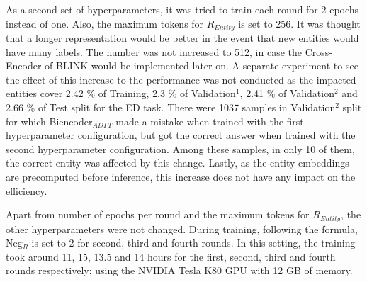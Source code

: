 \documentclass{report}
\theoremstyle{definition}
\theoremstyle{remark}
\begin{document}
As a second set of hyperparameters, it was tried to train each round for 2 epochs instead of one. Also, the maximum tokens for $R_{Entity}$ is set to 256. It was thought that a longer representation would be better in the event that new entities would have many labels. The number was not increased to 512, in case the Cross-Encoder of BLINK \cite{scalablezeroshot} would be implemented later on. A separate experiment to see the effect of this increase to the performance was not conducted as the impacted entities cover 2.42 \% of Training, 2.3 \% of Validation$^1$, 2.41 \% of Validation$^2$ and 2.66 \% of Test split for the ED task. There were 1037 samples in Validation$^2$ split for which Biencoder$_{ADPT}$ made a mistake when trained with the first hyperparameter configuration, but got the correct answer when trained with the second hyperparameter configuration. Among these samples, in only 10 of them, the correct entity was affected by this change. Lastly, as the entity embeddings are precomputed before inference, this increase does not have any impact on the efficiency.

Apart from number of epochs per round and the maximum tokens for $R_{Entity}$, the other hyperparameters were not changed. During training, following the formula, Neg$_R$ is set to 2 for second, third and fourth rounds. In this setting, the training took around 11, 15, 13.5 and 14 hours for the first, second, third and fourth rounds respectively; using the NVIDIA Tesla K80 GPU with 12 GB of memory.
\end{document}
